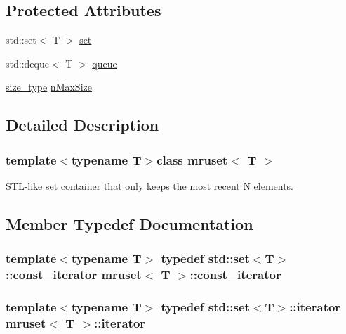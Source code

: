 \subsection*{Protected Attributes}
\begin{DoxyCompactItemize}
\item 
std\+::set$<$ T $>$ \hyperlink{classmruset_a4981fc3556b61600418b2ddad98cc685}{set}
\item 
std\+::deque$<$ T $>$ \hyperlink{classmruset_a6be1fe81dc472e25e160911288373663}{queue}
\item 
\hyperlink{classmruset_aaee46af18d8a5bdc503e9570e499a335}{size\+\_\+type} \hyperlink{classmruset_a6d3d6963e3ca5689e846b12a29dd09ab}{n\+Max\+Size}
\end{DoxyCompactItemize}


\subsection{Detailed Description}
\subsubsection*{template$<$typename T$>$class mruset$<$ T $>$}

S\+T\+L-\/like set container that only keeps the most recent N elements. 

\subsection{Member Typedef Documentation}
\hypertarget{classmruset_a74c77f7642e8e4db7cc79991c4345692}{}
\subsubsection[{const\+\_\+iterator}]{\setlength{\rightskip}{0pt plus 5cm}template$<$typename T$>$ typedef std\+::set$<$T$>$\+::{\bf const\+\_\+iterator} {\bf mruset}$<$ T $>$\+::{\bf const\+\_\+iterator}}\label{classmruset_a74c77f7642e8e4db7cc79991c4345692}
\hypertarget{classmruset_a246172eda1afff45be47a013c14b1ad6}{}
\subsubsection[{iterator}]{\setlength{\rightskip}{0pt plus 5cm}template$<$typename T$>$ typedef std\+::set$<$T$>$\+::{\bf iterator} {\bf mruset}$<$ T $>$\+::{\bf iterator}}\label{classmruset_a246172eda1afff45be47a013c14b1ad6}
\hypertarget{classmruset_a282941ee7f0438b0c09274b10c78cda0}{}
